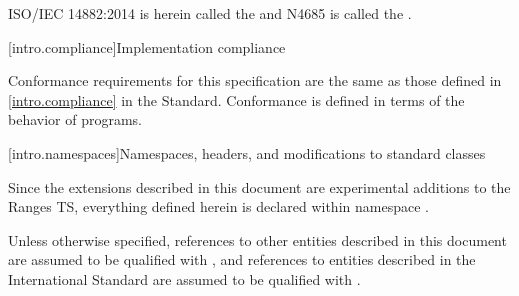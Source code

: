 ISO/IEC 14882:2014 is herein called the \defn{C\Rplus\Rplus\xspace Standard} and N4685 is called
the .

[intro.compliance]{Implementation compliance}

\pnum
Conformance requirements for this specification are the same as those
defined in \ref{intro.compliance} in the \Cpp Standard.
\enternote
Conformance is defined in terms of the behavior of programs.
\exitnote

[intro.namespaces]{Namespaces, headers, and modifications to standard classes}

\pnum
Since the extensions described in this document are experimental additions to the Ranges TS,
everything defined herein is declared within namespace .

\pnum
Unless otherwise specified, references to other entities described in this
document are assumed to be qualified with , and
references to entities described in the International Standard are assumed to be
qualified with .

